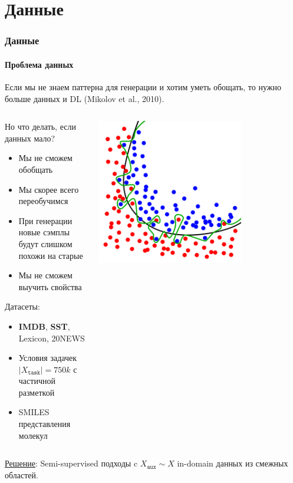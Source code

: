 \documentclass[10pt]{beamer}
\begin{document}
\section{Данные}
\begin{frame}
\frametitle{Данные}
\framesubtitle{Проблема данных}

Если мы не знаем паттерна для генерации и хотим уметь обощать, то нужно больше данных и DL (Mikolov et al., 2010). \\

\begin{columns}
    \begin{column}{0.5\textwidth}
        \vskip2mm
        Но что делать, если данных мало?
        \begin{itemize}
            \item Мы не сможем обобщать 
            \item Мы скорее всего переобучимся
            \item При генерации новые сэмплы будут слишком похожи на старые
            \item Мы не сможем выучить свойства
        \end{itemize}
        Датасеты:
        \begin{itemize}
            \item \textbf{IMDB}, \textbf{SST}, Lexicon, 20NEWS
            \item Условия задачек $|X_{\texttt{task}}| = 750k$ с частичной разметкой
            \item SMILES представления молекул
        \end{itemize}
    \end{column}
    \begin{column}{0.5\textwidth}
        \begin{center}
            \includegraphics[width=0.7\textwidth]{images/overfitting.png}
        \end{center}
    \end{column}
\end{columns}

\underline{Решение}: Semi-supervised подходы c $X_{\texttt{aux}} \sim X$ in-domain данных из смежных областей.

\end{frame}
\end{document}
